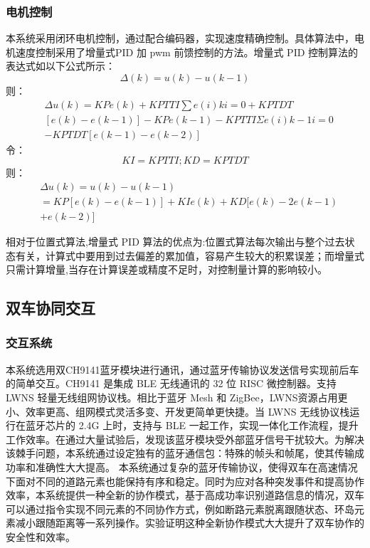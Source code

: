 \documentclass{article}%
\begin{document}
\begin{multicols}{2}
		\subsubsection{电机控制}
		本系统采用闭环电机控制，通过配合编码器，实现速度精确控制。具体算法中，电机速度控制采用了增量式PID 加 pwm 前馈控制的方法。增量式 PID 控制算法的表达式如以下公式所示：
		\begin{equation}
			\Delta(k) = u(k)-u(k-1)
		\end{equation}	
		则：
		\begin{equation}					
			\begin{split}				
				&\Delta u(k) = K P e(k)+K P T T I \sum e(i) k i = 0+K P T D T \\
				&[e(k)-e(k-1)]-K P e(k-1)-K P T T I \Sigma e(i) k-1 i = 0 \\
				& -K P T D T[e(k-1)-e(k-2)] 
			\end{split}
		\end{equation}						
		令：
		\begin{equation}
			 K I = K P T T I ; K D = K P T D T 
		\end{equation}
		则：	
		\begin{equation}
			\begin{split}	
				&\Delta u(k) = u(k)-u(k-1) \\
				&= K P[e(k)-e(k-1)]+K I e(k)+K D[e(k)-2 e(k-1)\\
				&+e(k-2)]
			\end{split}	
		\end{equation}
		
		相对于位置式算法,增量式 PID 算法的优点为:位置式算法每次输出与整个过去状态有关，计算式中要用到过去偏差的累加值，容易产生较大的积累误差；而增量式只需计算增量,当存在计算误差或精度不足时，对控制量计算的影响较小。
		
		
		\subsection{双车协同交互}
		
		\subsubsection{交互系统}
		
		本系统选用双CH9141蓝牙模块进行通讯，通过蓝牙传输协议发送信号实现前后车的简单交互。CH9141 是集成 BLE 无线通讯的 32 位 RISC 微控制器。支持 LWNS 轻量无线组网协议栈。相比于蓝牙 Mesh 和 ZigBee，LWNS资源占用更小、效率更高、组网模式灵活多变、开发更简单更快捷。当 LWNS 无线协议栈运行在蓝牙芯片的 2.4G 上时，支持与 BLE 一起工作，实现一体化工作流程，提升工作效率。在通过大量试验后，发现该蓝牙模块受外部蓝牙信号干扰较大。为解决该棘手问题，本系统通过设定独有的蓝牙通信包：特殊的帧头和帧尾，使其传输成功率和准确性大大提高。 本系统通过复杂的蓝牙传输协议，使得双车在高速情况下面对不同的道路元素也能保持有序和稳定。同时为应对各种突发事件和提高协作效率，本系统提供一种全新的协作模式，基于高成功率识别道路信息的情况，双车可以通过指令实现不同元素的不同协作方式，例如断路元素脱离跟随状态、环岛元素减小跟随距离等一系列操作。实验证明这种全新协作模式大大提升了双车协作的安全性和效率。
		

\end{multicols}
\end{document}
